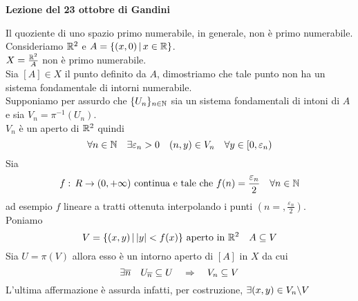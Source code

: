 


\textbf{Lezione del 23 ottobre di Gandini}
\begin{ese}Il quoziente di uno spazio primo numerabile, in generale, non \`e primo numerabile.\\
Consideriamo $\mathbb{R}^2$ e $A =\{ (x,0) \, \vert \, x \in \mathbb{R}\}$.\\
$X=\frac{\mathbb{R}^2}{A}$ non \`e primo numerabile.\\
Sia $[A]\in X$ il punto definito da $A$, dimostriamo che tale punto non ha un sistema fondamentale di intorni numerabile.\\
Supponiamo per assurdo che $\displaystyle \{ U_n \}_{n \in \mathbb{N}}$ sia un sistema fondamentali di intoni di $A$ e sia $V_n = \pi^{-1}(U_n)$.\\
$V_n$ \`e un aperto di $\mathbb{R}^2$ quindi 
$$ \forall n \in \mathbb{N} \quad \exists \varepsilon_n >0 \quad (n,y) \in V_n \quad \forall y \in [0,\varepsilon_n)$$
Sia 
$$f:\, R \to ( 0, + \infty) \text{ continua  e tale che } f(n) = \frac{\varepsilon_n}{2}\quad \forall n \in \mathbb{N}$$
ad esempio $f$ lineare a tratti ottenuta interpolando i punti $\left( n =, \frac{\varepsilon_n}{2}\right)$.\\
Poniamo 
$$ V = \{ (x,y) \, \vert \, \vert y \vert < f(x) \} \text{ aperto in } \mathbb{R}^2 \quad A \subseteq V $$
Sia $U= \pi (V)$ allora esso \`e un intorno aperto di $[A]$ in $X$ da cui 
$$  \exists \overline{n} \quad U_{\overline{n}} \subseteq U \quad \Rightarrow \quad V_n \subseteq V $$
L'ultima affermazione \`e assurda infatti, per costruzione, $\exists (x,y) \in V_n \backslash V $
\end{ese}
